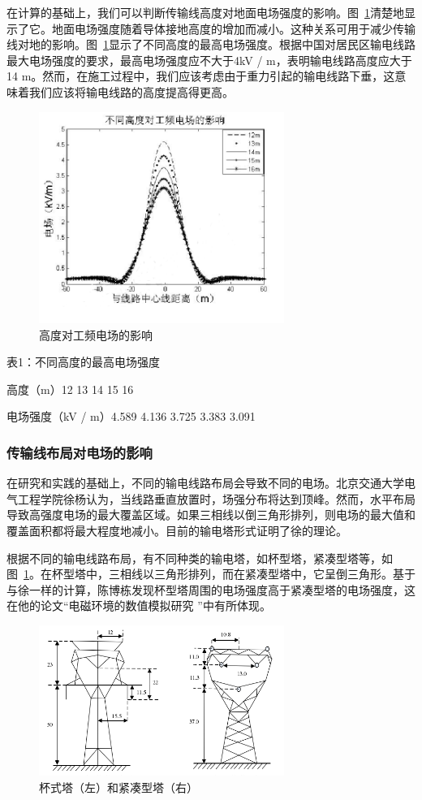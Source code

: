 \documentclass{ctexart} %
\begin{document}
在计算的基础上，我们可以判断传输线高度对地面电场强度的影响。图~\ref{1}清楚地显示了它。地面电场强度随着导体接地高度的增加而减小。这种关系可用于减少传输线对地的影响。图~\ref{1}显示了不同高度的最高电场强度。根据中国对居民区输电线路最大电场强度的要求，最高电场强度应不大于4kV / m，表明输电线路高度应大于14 m。然而，在施工过程中，我们应该考虑由于重力引起的输电线路下垂，这意味着我们应该将输电线路的高度提高得更高。
\begin{figure}[htbp]
\small
\centering
\includegraphics[width=8cm]{1.png}
\caption{高度对工频电场的影响} 
\label{1}
\end{figure}


表1：不同高度的最高电场强度

高度（m）12 13 14 15 16

电场强度（kV / m）4.589 4.136 3.725 3.383 3.091


\subsubsection{传输线布局对电场的影响}
在研究和实践的基础上，不同的输电线路布局会导致不同的电场。北京交通大学电气工程学院徐杨认为，当线路垂直放置时，场强分布将达到顶峰\cite{许杨2007高压输电线路工频电磁环境}。然而，水平布局导致高强度电场的最大覆盖区域。如果三相线以倒三角形排列，则电场的最大值和覆盖面积都将最大程度地减小。目前的输电塔形式证明了徐的理论。

根据不同的输电线路布局，有不同种类的输电塔，如杯型塔，紧凑型塔等，如图~\ref{1}。在杯型塔中，三相线以三角形排列，而在紧凑型塔中，它呈倒三角形。基于与徐一样的计算，陈博栋发现杯型塔周围的电场强度高于紧凑型塔的电场强度，这在他的论文“电磁环境的数值模拟研究\cite{陈博栋2015特高压输电线路电磁环境数值模拟研究} ”中有所体现。

\begin{figure}[htbp]
\small
\centering
\includegraphics[width=8cm]{2.png}
\caption{杯式塔（左）和紧凑型塔（右）} 
\label{2}
\end{figure}
\end{document}
